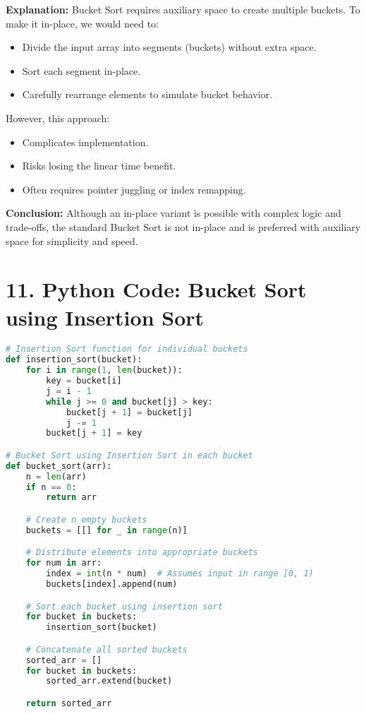 \documentclass[14pt]{extarticle}
\begin{document}
\textbf{Explanation:} Bucket Sort requires auxiliary space to create multiple buckets. To make it in-place, we would need to:
\begin{itemize}
    \item Divide the input array into segments (buckets) without extra space.
    \item Sort each segment in-place.
    \item Carefully rearrange elements to simulate bucket behavior.
\end{itemize}

However, this approach:
\begin{itemize}
    \item Complicates implementation.
    \item Risks losing the linear time benefit.
    \item Often requires pointer juggling or index remapping.
\end{itemize}

\textbf{Conclusion:} Although an in-place variant is possible with complex logic and trade-offs, the standard Bucket Sort is not in-place and is preferred with auxiliary space for simplicity and speed.



\newpage
\section*{11. Python Code: Bucket Sort using Insertion Sort}

\begin{lstlisting}[language=Python]
# Insertion Sort function for individual buckets
def insertion_sort(bucket):
    for i in range(1, len(bucket)):
        key = bucket[i]
        j = i - 1
        while j >= 0 and bucket[j] > key:
            bucket[j + 1] = bucket[j]
            j -= 1
        bucket[j + 1] = key

# Bucket Sort using Insertion Sort in each bucket
def bucket_sort(arr):
    n = len(arr)
    if n == 0:
        return arr

    # Create n empty buckets
    buckets = [[] for _ in range(n)]

    # Distribute elements into appropriate buckets
    for num in arr:
        index = int(n * num)  # Assumes input in range [0, 1)
        buckets[index].append(num)

    # Sort each bucket using insertion sort
    for bucket in buckets:
        insertion_sort(bucket)

    # Concatenate all sorted buckets
    sorted_arr = []
    for bucket in buckets:
        sorted_arr.extend(bucket)

    return sorted_arr
\end{lstlisting}
\end{document}
